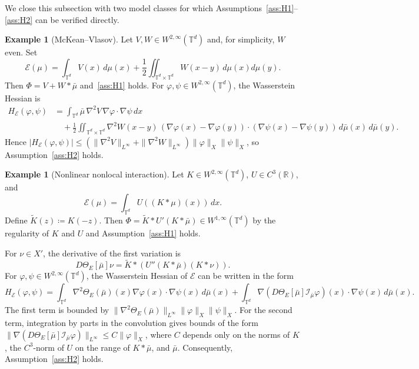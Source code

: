 \documentclass[11pt]{article}
\numberwithin{equation}{section}
\theoremstyle{definition}
\newtheorem{example}[theorem]{Example}
\newcommand{\R}{\mathbb{R}}
\newcommand{\T}{\mathbb{T}}
\newcommand{\E}{\mathcal{E}}
\newcommand{\rieszmap}[1][\mu]{\mathcal{I}_{#1}}
\begin{document}
We close this subsection with two model classes for which Assumptions~\ref{ass:H1}--\ref{ass:H2} can be verified directly.

\begin{example}[McKean--Vlasov]
    \label{ex:mckean-vlasov-energy}
    Let $V, W \in W^{2,\infty}(\T^d)$ and, for simplicity, $W$ even. 
    Set
    \begin{equation}
        \label{eq:mckean_vlasov_equation}
        \E(\mu) = \int_{\T^d} V(x) \, d\mu(x) + \frac{1}{2}\iint_{\T^d\times\T^d} W(x-y)\,d\mu(x)d\mu(y).
    \end{equation}
    Then $\Phi = V + W * \bar\mu$ and~\ref{ass:H1} holds.
    For $\varphi, \psi \in W^{2, \infty}(\T^d)$, the Wasserstein Hessian is
    \begin{align*}
        H_{\E}(\varphi,\psi) &= \int_{\T^d} \bar\mu\,\nabla^2 V\,\nabla\varphi \cdot \nabla\psi \, dx \\
        &\quad + \frac{1}{2}\iint_{\T^d\times\T^d} \nabla^2 W(x-y)\,(\nabla\varphi(x)-\nabla\varphi(y))\cdot(\nabla\psi(x)-\nabla\psi(y))\,d\bar\mu(x)\,d\bar\mu(y).
    \end{align*}
    Hence $|H_\E(\varphi,\psi)| \le \left(\|\nabla^2V\|_{L^\infty} + \|\nabla^2W\|_{L^\infty}\right)\|\varphi\|_X\|\psi\|_X$, so Assumption~\ref{ass:H2} holds.
\end{example}

\begin{example}[Nonlinear nonlocal interaction]
\label{ex:nonlinear-nonlocal-interaction}
    Let $K \in W^{2,\infty}(\T^d)$, $U \in C^3(\R)$, and
    \[ 
    \E(\mu) = \int_{\T^d} U((K*\mu)(x)) \, dx.
    \]
    Define $\widetilde{K}(z) \coloneqq K(-z)$. 
    Then $\Phi = \widetilde K*U'(K*\bar\mu) \in W^{1,\infty}(\T^d)$ by the regularity of $K$ and $U$ and Assumption~\ref{ass:H1} holds.
 
    For $\nu \in X'$, the derivative of the first variation is
    \[ 
    D\Theta_E[\bar\mu] \nu = \widetilde{K} * \left(U''(K * \bar\mu)(K * \nu)\right). 
    \]
    For $\varphi, \psi \in W^{2,\infty}(\T^d)$, the Wasserstein Hessian of $\E$ can be written in the form
    \[ 
    H_\E(\varphi,\psi) = \int_{\T^d} \nabla^2\Theta_E(\bar\mu)(x) \nabla\varphi(x) \cdot \nabla\psi(x) \, d\bar\mu(x) + \int_{\T^d} \nabla(D\Theta_E[\bar\mu] \rieszmap[\bar\mu]\varphi)(x) \cdot \nabla\psi(x) \, d\bar\mu(x). 
    \]
    The first term is bounded by $\|\nabla^2\Theta_E(\bar\mu)\|_{L^\infty}\|\varphi\|_X\|\psi\|_X$. 
    For the second term, integration by parts in the convolution gives bounds of the form $\|\nabla(D\Theta_E[\bar\mu]\rieszmap[\bar\mu]\varphi)\|_{L^\infty} \le C\|\varphi\|_X$, where $C$ depends only on the norms of $K$, the $C^3$-norm of $U$ on the range of $K*\bar\mu$, and $\bar\mu$. 
    Consequently, Assumption~\ref{ass:H2} holds.
\end{example}
\end{document}
